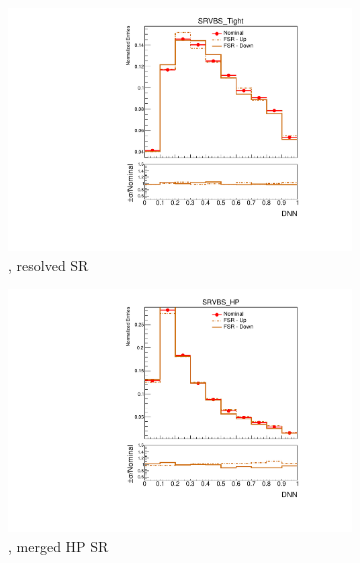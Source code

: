 \begin{figure}[htp]
    \centering
    \begin{subfigure}[b]{0.3\textwidth}
        \includegraphics[width=\textwidth]{figures/1lep/PDFUnc/FSR/ttbar_0ptag2pjet_0ptv_SRVBS_Tight_DNN_SysTheoryFSR_Top__1up_Norm.pdf}
        \caption{\ttbar, resolved SR}
    \end{subfigure}
    \begin{subfigure}[b]{0.3\textwidth}
        \includegraphics[width=\textwidth]{figures/1lep/PDFUnc/FSR/ttbar_0ptag1pfat0pjet_0ptv_SRVBS_HP_DNN_SysTheoryFSR_Top__1up_Norm.pdf}
        \caption{\ttbar, merged HP SR}
    \end{subfigure}
    \begin{subfigure}[b]{0.3\textwidth}

\end{subfigure}
\end{figure}
